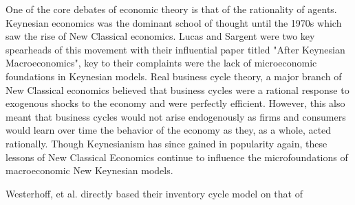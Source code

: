One of the core debates of economic theory is that of the rationality of agents. Keynesian economics was the dominant school of thought until the 1970s which saw the rise of New Classical economics\autocite{Hartley2013}. Lucas and Sargent were two key spearheads of this movement with their influential paper titled "After Keynesian Macroeconomics"\autocite{Lucas1979}, key to their complaints were the lack of microeconomic foundations in Keynesian models. Real business cycle theory, a major branch of New Classical economics believed that business cycles were a rational response to exogenous shocks to the economy and were perfectly efficient. However, this also meant that business cycles would not arise endogenously as firms and consumers would learn over time the behavior of the economy as they, as a whole, acted rationally. Though Keynesianism has since gained in popularity again, these lessons of New Classical Economics continue to influence the microfoundations of macroeconomic New Keynesian models.

Westerhoff, et al. directly based their inventory cycle model on that of 